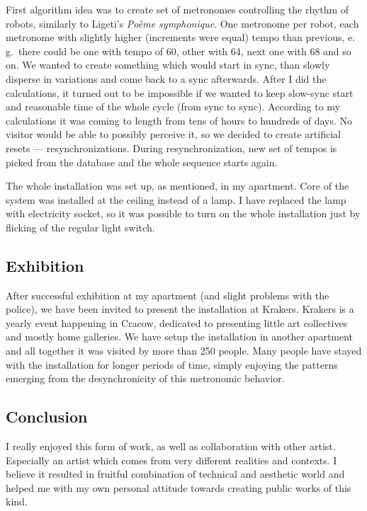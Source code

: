 \documentclass[12pt,a4paper,oneside]{report}
\begin{document}
First algorithm idea was to create set of metronomes controlling the rhythm of robots, similarly to Ligeti's \emph{Poème symphonique}. One metronome per robot, each metronome with slightly higher (increments were equal) tempo than previous, e. g.\ there could be one with tempo of 60, other with 64, next one with 68 and so on. We wanted to create something which would start in sync, than slowly disperse in variations and come back to a sync afterwards. After I did the calculations, it turned out to be impossible if we wanted to keep slow-sync start and reasonable time of the whole cycle (from sync to sync). According to my calculations it was coming to length from tens of hours to hundreds of days. No visitor would be able to possibly perceive it, so we decided to create artificial resets --- resynchronizations. During resynchronization, new set of tempos is picked from the database and the whole sequence starts again.

The whole installation was set up, as mentioned, in my apartment. Core of the system was installed at the ceiling instead of a lamp. I have replaced the lamp with electricity socket, so it was possible to turn on the whole installation just by flicking of the regular light switch.

\subsection{Exhibition} After successful exhibition at my apartment (and slight problems with the police), we have been invited to present the installation at Krakers. Krakers is a yearly event happening in Cracow, dedicated to presenting little art collectives and mostly home galleries. We have setup the installation in another apartment and all together it was visited by more than 250 people. Many people have stayed with the installation for longer periods of time, simply enjoying the patterns emerging from the desynchronicity of this metronomic behavior.

\subsection{Conclusion} I really enjoyed this form of work, as well as collaboration with other artist. Especially an artist which comes from very different realities and contexts. I believe it resulted in fruitful combination of technical and aesthetic world and helped me with my own personal attitude towards creating public works of this kind.
\end{document}
